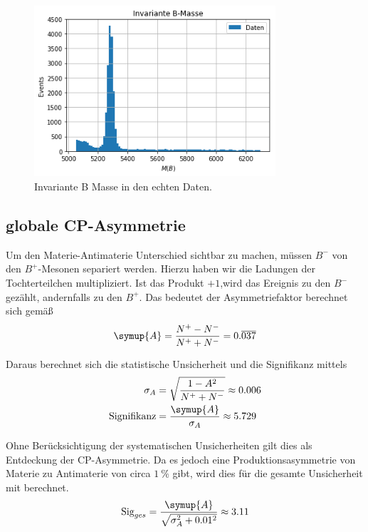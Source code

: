 \begin{figure}[htb]
  \centering
  \includegraphics[width=0.8\textwidth]{plots/real_data_inv_masse_B.png}
  \caption{Invariante B Masse in den echten Daten.}
  \label{fig:realBMass}
\end{figure}

\newpage

\subsection{globale CP-Asymmetrie}
\label{sec:globCP}

Um den Materie-Antimaterie Unterschied sichtbar zu machen, m\"ussen $B^{-}$ von den $B^{+}$-Mesonen separiert werden.
Hierzu haben wir die Ladungen der Tochterteilchen multipliziert.
Ist das Produkt $+1$,wird das Ereignis zu den $B^{-}$ gez\"ahlt, andernfalls zu den $B^{+}$.
Das bedeutet der Asymmetriefaktor berechnet sich gem\"a\ss
\begin{equation}
  \symup{A} = \frac{N^{+} - N^{-}}{N^{+} + N^{-}} = 0.\overline{037}
\end{equation}

Daraus berechnet sich die statistische Unsicherheit und die Signifikanz mittels
\begin{align}
  \sigma_A &= \sqrt{\frac{1 - A^2}{N^{+} + N^{-}} } \approx 0.006 \\
  \text{Signifikanz} &= \frac{\symup{A}}{\sigma_A} \approx 5.729
\end{align}

Ohne Ber\"ucksichtigung der systematischen Unsicherheiten gilt dies als Entdeckung der CP-Asymmetrie.
Da es jedoch eine Produktionsasymmetrie von Materie zu Antimaterie von circa $\SI{1}{\percent}$ gibt, wird dies f\"ur die gesamte Unsicherheit mit berechnet.
\begin{equation}
  \text{Sig}_{ges} = \frac{\symup{A}}{\sqrt{\sigma_A^2 + 0.01^2}} \approx 3.11
\end{equation}

